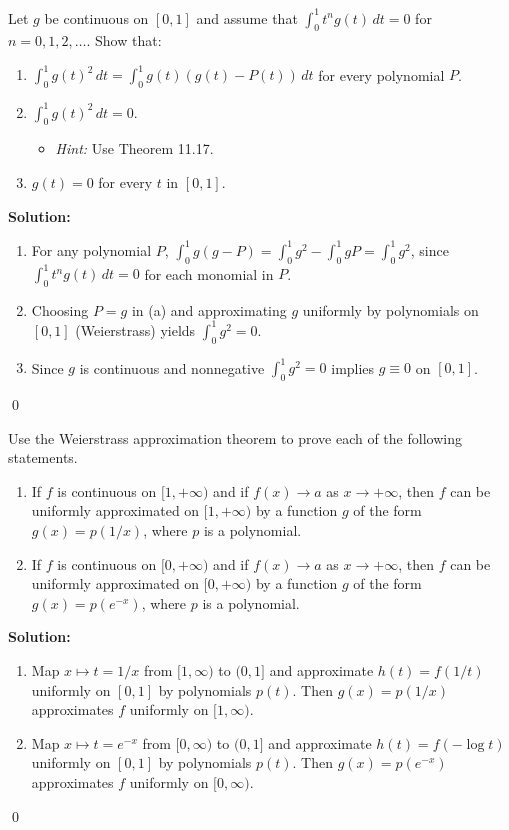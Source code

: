 \begin{problembox}
Let $g$ be continuous on $[0, 1]$ and assume that $\int_0^1 t^n g(t) \, dt = 0$ for $n = 0, 1, 2, \dots$. Show that:
\begin{enumerate}[label=(\alph*)]
\item $\int_0^1 g(t)^2 \, dt = \int_0^1 g(t)(g(t) - P(t)) \, dt$ for every polynomial $P$.
\item $\int_0^1 g(t)^2 \, dt = 0$.
\begin{itemize}
\item \textit{Hint:} Use Theorem 11.17.
\end{itemize}
\item $g(t) = 0$ for every $t$ in $[0, 1]$.
\end{enumerate}
\end{problembox}

\noindent\textbf{Solution:}
\begin{enumerate}[label=(\alph*)]
\item For any polynomial $P$, $\int_0^1 g(g-P)=\int_0^1 g^2-\int_0^1 gP=\int_0^1 g^2$, since $\int_0^1 t^n g(t)\,dt=0$ for each monomial in $P$.
\item Choosing $P=g$ in (a) and approximating $g$ uniformly by polynomials on $[0,1]$ (Weierstrass) yields $\int_0^1 g^2=0$.
\item Since $g$ is continuous and nonnegative $\int_0^1 g^2=0$ implies $g\equiv0$ on $[0,1]$.
\end{enumerate}\qed


\begin{problembox}
Use the Weierstrass approximation theorem to prove each of the following statements.
\begin{enumerate}[label=(\alph*)]
\item If $f$ is continuous on $[1, +\infty)$ and if $f(x) \to a$ as $x \to +\infty$, then $f$ can be uniformly approximated on $[1, +\infty)$ by a function $g$ of the form $g(x) = p(1/x)$, where $p$ is a polynomial.
\item If $f$ is continuous on $[0, +\infty)$ and if $f(x) \to a$ as $x \to +\infty$, then $f$ can be uniformly approximated on $[0, +\infty)$ by a function $g$ of the form $g(x) = p(e^{-x})$, where $p$ is a polynomial.
\end{enumerate}
\end{problembox}

\noindent\textbf{Solution:}
\begin{enumerate}[label=(\alph*)]
\item Map $x\mapsto t=1/x$ from $[1,\infty)$ to $(0,1]$ and approximate $h(t)=f(1/t)$ uniformly on $[0,1]$ by polynomials $p(t)$. Then $g(x)=p(1/x)$ approximates $f$ uniformly on $[1,\infty)$.
\item Map $x\mapsto t=e^{-x}$ from $[0,\infty)$ to $(0,1]$ and approximate $h(t)=f(-\log t)$ uniformly on $[0,1]$ by polynomials $p(t)$. Then $g(x)=p(e^{-x})$ approximates $f$ uniformly on $[0,\infty)$.
\end{enumerate}\qed


